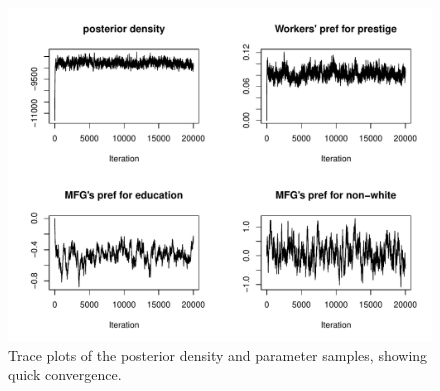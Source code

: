 \begin{figure}[!ht]
  \centering
  \includegraphics[width=\textwidth,keepaspectratio]{../figure/labor_occ5_misc_traceplots}
  \caption[Parameter traceplots]{Trace plots of the posterior density and
    parameter samples, showing quick convergence.}
  \label{fig:labor_occ5_misc_traceplots}
\end{figure}

